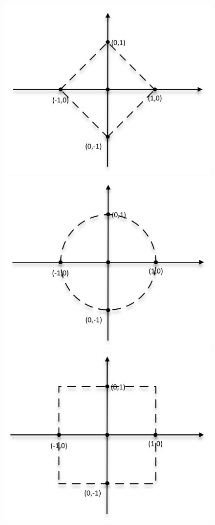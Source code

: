 \documentclass[submit]{harvardml}
\begin{document}
\begin{figure}[ht]
    \centering
    \includegraphics[scale=0.19]{prob2-1}
    \includegraphics[scale=0.19]{prob2-2}
    \includegraphics[scale=0.19]{prob2-3}

\end{figure}
\end{document}
